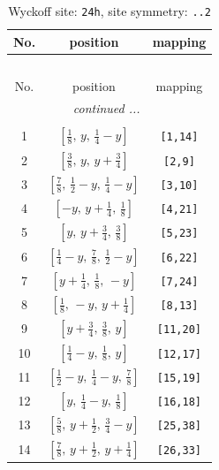 \documentclass[fleqn,8pt]{jsarticle}
\begin{document}
\begin{longtable}{ccc}
\caption{Wyckoff site: {\tt 24h}, site symmetry: {\tt ..2}}
 \\
 \hline \hline
No. & position & mapping \\ \hline \endfirsthead

\multicolumn{2}{l}{\tablename\ \thetable{}} \\
 \hline \hline
No. & position & mapping \\ \hline \endhead

 \hline \hline
\multicolumn{2}{r}{\footnotesize\it continued ...} \\ \endfoot

 \hline \hline
\multicolumn{2}{r}{} \\ \endlastfoot

1 & $\left[ \frac{1}{8},\, y,\, \frac{1}{4} - y \right]$ & {\tt [1,14]} \\ \hline
2 & $\left[ \frac{3}{8},\, y,\, y + \frac{3}{4} \right]$ & {\tt [2,9]} \\ \hline
3 & $\left[ \frac{7}{8},\, \frac{1}{2} - y,\, \frac{1}{4} - y \right]$ & {\tt [3,10]} \\ \hline
4 & $\left[ - y,\, y + \frac{1}{4},\, \frac{1}{8} \right]$ & {\tt [4,21]} \\ \hline
5 & $\left[ y,\, y + \frac{3}{4},\, \frac{3}{8} \right]$ & {\tt [5,23]} \\ \hline
6 & $\left[ \frac{1}{4} - y,\, \frac{7}{8},\, \frac{1}{2} - y \right]$ & {\tt [6,22]} \\ \hline
7 & $\left[ y + \frac{1}{4},\, \frac{1}{8},\, - y \right]$ & {\tt [7,24]} \\ \hline
8 & $\left[ \frac{1}{8},\, - y,\, y + \frac{1}{4} \right]$ & {\tt [8,13]} \\ \hline
9 & $\left[ y + \frac{3}{4},\, \frac{3}{8},\, y \right]$ & {\tt [11,20]} \\ \hline
10 & $\left[ \frac{1}{4} - y,\, \frac{1}{8},\, y \right]$ & {\tt [12,17]} \\ \hline
11 & $\left[ \frac{1}{2} - y,\, \frac{1}{4} - y,\, \frac{7}{8} \right]$ & {\tt [15,19]} \\ \hline
12 & $\left[ y,\, \frac{1}{4} - y,\, \frac{1}{8} \right]$ & {\tt [16,18]} \\ \hline
13 & $\left[ \frac{5}{8},\, y + \frac{1}{2},\, \frac{3}{4} - y \right]$ & {\tt [25,38]} \\ \hline
14 & $\left[ \frac{7}{8},\, y + \frac{1}{2},\, y + \frac{1}{4} \right]$ & {\tt [26,33]} \\ \hline

\end{longtable}
\end{document}
